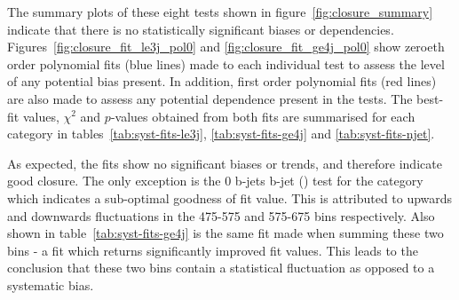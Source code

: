 The summary plots of these eight tests shown in figure~\ref{fig:closure_summary} 
indicate that there is no statistically significant biases or \HT dependencies. 
Figures~\ref{fig:closure_fit_le3j_pol0} and \ref{fig:closure_fit_ge4j_pol0} show
zeroeth order polynomial fits (blue lines) made to each individual test to assess the 
level of any potential bias present. In addition, first order polynomial fits 
(red lines) are
also made to assess any potential \HT dependence present in the tests.
The best-fit values, $\chi^2$ and $p$-values 
obtained from both fits are summarised for each \nj category in
tables~\ref{tab:syst-fits-le3j}, \ref{tab:syst-fits-ge4j} and
\ref{tab:syst-fits-njet}.

As expected, the fits show no significant biases or trends, and therefore 
indicate good closure. The only exception is the 0 b-jets  b-jet (\mj) test
for the \njhigh category
which indicates a sub-optimal goodness of fit value. This is 
attributed to upwards and downwards fluctuations in the 475-575 \gev and 575-675
\gev bins respectively. Also shown in table~\ref{tab:syst-fits-ge4j} is the 
same fit made when summing these two bins - a fit which returns significantly 
improved fit values. This leads to the conclusion that these two bins contain a 
statistical fluctuation as opposed to a systematic bias.

